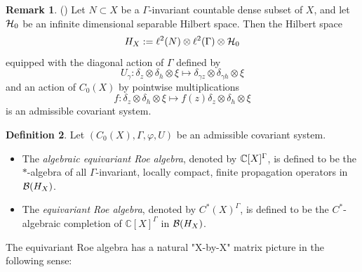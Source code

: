 \documentclass[11pt]{article}
\theoremstyle{definition}
\newtheorem{Def}{Definition}[section]
\newtheorem{Rem}[Def]{Remark}
\theoremstyle{plain}
\def\Ga{\Gamma}
\begin{document}
\begin{Rem}(\cite{KY2012})
Let $N\subset X$ be a $\Gamma$-invariant countable dense subset of $X$, and let $\mathcal H_0$ be an infinite dimensional separable Hilbert space. Then the Hilbert space
$$H_X:=\ell^2(N)\otimes \ell^2(\Gamma)\otimes \mathcal H_0$$
equipped with the diagonal action of $\Gamma$ defined by
$$U_\gamma: \delta_z\otimes \delta_h\otimes \xi \mapsto \delta_{\gamma z}\otimes \delta_{\gamma h}\otimes \xi$$
and an action of $C_0(X)$ by pointwise multiplications
$$f: \delta_z\otimes \delta_h\otimes \xi \mapsto f(z)\delta_z\otimes \delta_h\otimes \xi$$
is an admissible covariant system.
\end{Rem}

\begin{Def}
Let $(C_0(X), \Gamma, \varphi, U)$ be an admissible covariant system.\begin{itemize}
\item[(1)]The {\em algebraic equivariant Roe algebra},
denoted by $\IC[X]^{\Ga}$, is defined to be the $*$-algebra of all $\Gamma$-invariant, locally compact, finite propagation operators in $\mathcal B(H_X)$.
\item[(2)]The {\em equivariant Roe algebra}, denoted by $C^*(X)^{\Ga}$, is defined to be the $C^*$-algebraic completion of $\mathbb{C}[X]^{\Ga}$ in $\mathcal B(H_X)$.
\end{itemize}\end{Def}

The equivariant Roe algebra has a natural "X-by-X" matrix picture in the following sense:
\end{document}

